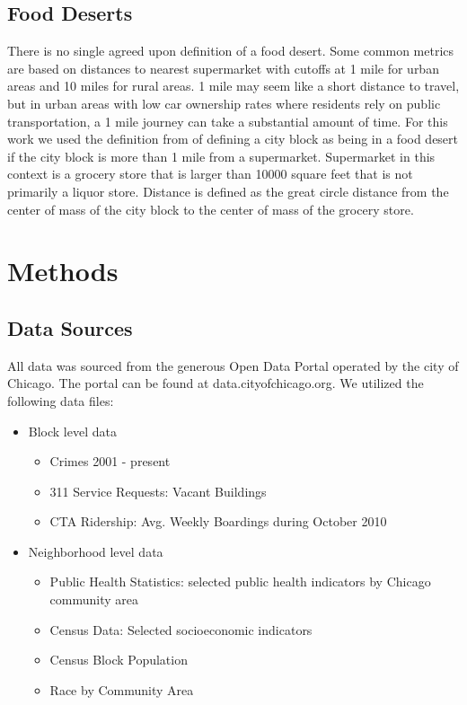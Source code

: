 \documentclass{IEEEtran}
\begin{document}
\subsection{Food Deserts}
There is no single agreed upon definition of a food desert. Some common metrics are based on distances to nearest supermarket with cutoffs at 1 mile for urban areas and 10 miles for rural areas. 1 mile may seem like a short distance to travel, but in urban areas with low car ownership rates where residents rely on public transportation, a 1 mile journey can take a substantial amount of time. 
For this work we used the definition from %
of defining a city block as being in a food desert if the city block is more than 1 mile from a supermarket. Supermarket in this context is a grocery store that is larger than 10000 square feet %
that is not primarily a liquor store. Distance is defined as the great circle distance from the center of mass of the city block to the center of mass of the grocery store. 
\section{Methods}

\subsection{Data Sources}

All data was sourced from the generous Open Data Portal operated by the city of Chicago. The portal can be found at data.cityofchicago.org. We utilized the following data files:
\begin{itemize}
\item Block level data
  \begin{itemize}
  \item Crimes 2001 - present
  \item 311 Service Requests: Vacant Buildings
  \item CTA Ridership: Avg. Weekly Boardings during October 2010
  \end{itemize}
\item Neighborhood level data
  \begin{itemize}
  \item Public Health Statistics: selected public health indicators by Chicago community area
  \item Census Data: Selected socioeconomic indicators    
  \item Census Block Population    
  \item Race by Community Area 
  \end{itemize}
\end{itemize}
\end{document}
